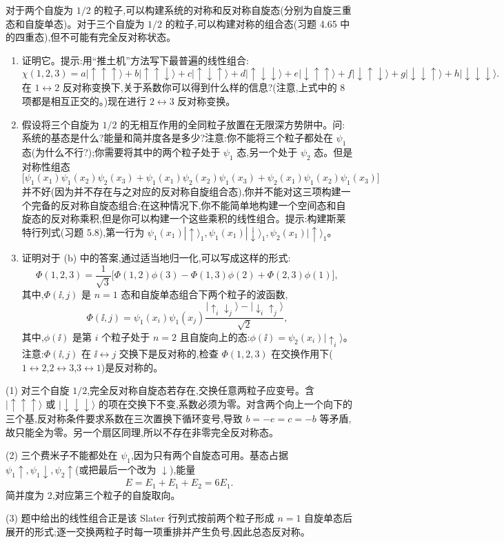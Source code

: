 \begin{question}
对于两个自旋为 $1/2$ 的粒子,可以构建系统的对称和反对称自旋态(分别为自旋三重态和自旋单态)。对于三个自旋为 $1/2$ 的粒子,可以构建对称的组合态(习题 4.65 中的四重态),但不可能有完全反对称状态。
\begin{enumerate}
\item 证明它。提示:用“推土机”方法写下最普遍的线性组合:
\[
\chi(1,2,3)=a|\uparrow\uparrow\uparrow\rangle+b|\uparrow\uparrow\downarrow\rangle+c|\uparrow\downarrow\uparrow\rangle+d|\uparrow\downarrow\downarrow\rangle+e|\downarrow\uparrow\uparrow\rangle+f|\downarrow\uparrow\downarrow\rangle+g|\downarrow\downarrow\uparrow\rangle+h|\downarrow\downarrow\downarrow\rangle.
\]
在 $1\leftrightarrow 2$ 反对称变换下,关于系数你可以得到什么样的信息?(注意,上式中的 8 项都是相互正交的。)现在进行 $2\leftrightarrow 3$ 反对称变换。
\item 假设将三个自旋为 $1/2$ 的无相互作用的全同粒子放置在无限深方势阱中。问:系统的基态是什么?能量和简并度各是多少?注意:你不能将三个粒子都处在 $\psi_1$ 态(为什么不行?);你需要将其中的两个粒子处于 $\psi_1$ 态,另一个处于 $\psi_2$ 态。但是对称性组态
\[
\bigl[\psi_1(x_1)\psi_1(x_2)\psi_2(x_3)+\psi_1(x_1)\psi_2(x_2)\psi_1(x_3)+\psi_2(x_1)\psi_1(x_2)\psi_1(x_3)\bigr]
\]
并不好(因为并不存在与之对应的反对称自旋组合态),你并不能对这三项构建一个完备的反对称自旋态组合;在这种情况下,你不能简单地构建一个空间态和自旋态的反对称乘积,但是你可以构建一个这些乘积的线性组合。提示:构建斯莱特行列式(习题 5.8),第一行为 $\psi_1(x_1)|\uparrow\rangle_1,\psi_1(x_1)|\downarrow\rangle_1,\psi_2(x_1)|\uparrow\rangle_1$。
\item 证明对于 (b) 中的答案,通过适当地归一化,可以写成这样的形式:
\[
\Phi(1,2,3)=\frac{1}{\sqrt3}\bigl[\Phi(1,2)\phi(3)-\Phi(1,3)\phi(2)+\Phi(2,3)\phi(1)\bigr],
\]
其中,$\Phi(\ii,j)$ 是 $n=1$ 态和自旋单态组合下两个粒子的波函数,
\[
\Phi(\ii,j)=\psi_1(x_i)\psi_1(x_j)\frac{|\uparrow_i\downarrow_j\rangle-|\downarrow_i\uparrow_j\rangle}{\sqrt2},
\]
其中,$\phi(\ii)$ 是第 $i$ 个粒子处于 $n=2$ 且自旋向上的态:$\phi(\ii)=\psi_2(x_i)|\uparrow_i\rangle$。注意:$\Phi(\ii,j)$ 在 $\ii\leftrightarrow j$ 交换下是反对称的,检查 $\Phi(1,2,3)$ 在交换作用下($1\leftrightarrow2$,$2\leftrightarrow3$,$3\leftrightarrow1$)是反对称的。
\end{enumerate}
\end{question}
\begin{solution}

(1) 对三个自旋 $1/2$,完全反对称自旋态若存在,交换任意两粒子应变号。含 $|\uparrow\uparrow\uparrow\rangle$ 或 $|\downarrow\downarrow\downarrow\rangle$ 的项在交换下不变,系数必须为零。对含两个向上一个向下的三个基,反对称条件要求系数在三次置换下循环变号,导致 $b=-e=c=-b$ 等矛盾,故只能全为零。另一个扇区同理,所以不存在非零完全反对称态。

(2) 三个费米子不能都处在 $\psi_1$,因为只有两个自旋态可用。基态占据 $\psi_1\uparrow,\psi_1\downarrow,\psi_2\uparrow$(或把最后一个改为 $\downarrow$),能量
\[
E=E_1+E_1+E_2=6E_1.
\]
简并度为 2,对应第三个粒子的自旋取向。

(3) 题中给出的线性组合正是该 Slater 行列式按前两个粒子形成 $n=1$ 自旋单态后展开的形式;逐一交换两粒子时每一项重排并产生负号,因此总态反对称。

\end{solution}

